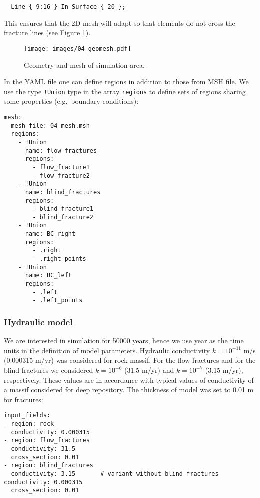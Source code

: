 \begin{verbatim}
  Line { 9:16 } In Surface { 20 };
\end{verbatim}

This ensures that the 2D mesh will adapt so that elements do not cross
the fracture lines (see Figure \ref{fig:mesh}).

\begin{figure}[htbp]
\centering
\texttt{[image: images/04\_geomesh.pdf]}
\caption{Geometry and mesh of simulation area.\label{fig:mesh}}
\end{figure}

In the YAML file one can define regions in addition to those from MSH
file. We use the type \texttt{!Union} type in the array \texttt{regions}
to define sets of regions sharing some properties (e.g.~boundary
conditions):

\begin{verbatim}
mesh:
  mesh_file: 04_mesh.msh
  regions:
    - !Union
      name: flow_fractures
      regions:
        - flow_fracture1
        - flow_fracture2
    - !Union
      name: blind_fractures
      regions:
        - blind_fracture1
        - blind_fracture2
    - !Union
      name: BC_right
      regions:
        - .right
        - .right_points
    - !Union
      name: BC_left
      regions:
        - .left
        - .left_points
\end{verbatim}

\subsubsection{Hydraulic model}\label{hydraulic-model}

We are interested in simulation for 50000 years, hence we use year as
the time units in the definition of model parameters. Hydraulic
conductivity \(k = 10^{-11}\) m/s (0.000315 m/yr) was considered for
rock massif. For the flow fractures and for the blind fractures we
considered \(k = 10^{-6}\) (31.5 m/yr) and \(k = 10^{-7}\) (3.15 m/yr),
respectively. These values are in accordance with typical values of
conductivity of a massif considered for deep repository. The thickness
of model was set to 0.01 m for fractures:

\begin{verbatim}
input_fields:
- region: rock
  conductivity: 0.000315
- region: flow_fractures
  conductivity: 31.5
  cross_section: 0.01
- region: blind_fractures
  conductivity: 3.15       # variant without blind-fractures conductivity: 0.000315
  cross_section: 0.01
\end{verbatim}


